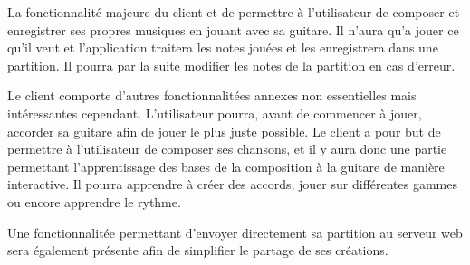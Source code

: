 La fonctionnalité majeure du client et de permettre à l'utilisateur de composer et enregistrer ses propres musiques en jouant avec sa guitare. Il n'aura qu'a jouer ce qu'il veut et l'application traitera les notes jouées et les enregistrera dans une partition. Il pourra par la suite modifier les notes de la partition en cas d'erreur. 

Le client comporte d'autres fonctionnalitées annexes non essentielles mais intéressantes cependant.
L'utilisateur pourra, avant de commencer à jouer, accorder sa guitare afin de jouer le plus juste possible.
Le client a pour but de permettre à l'utilisateur de composer ses chansons, et il y aura donc une partie permettant l'apprentissage des bases de la composition à la guitare de manière interactive. Il pourra apprendre à créer des accords, jouer sur différentes gammes ou encore apprendre le rythme.

Une fonctionnalitée permettant d'envoyer directement sa partition au serveur web sera également présente afin de simplifier le partage de ses créations.